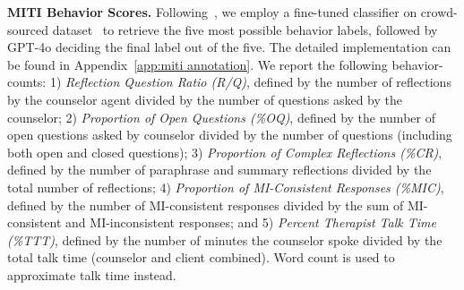 \noindent
\textbf{MITI Behavior Scores.} Following~\citet{xie2024few}, we employ a fine-tuned classifier on crowd-sourced dataset~\citep{welivita2022curating} to retrieve the five most possible behavior labels, followed by GPT-4o deciding the final label out of the five. The detailed implementation can be found in Appendix~\ref{app:miti annotation}.  We report the following behavior-counts: 1) \emph{Reflection Question Ratio (R/Q)}, defined by the number of reflections by the counselor agent divided by the number of questions asked by the counselor; 2) \emph{Proportion of Open Questions (\%OQ)}, defined by the number of open questions asked by counselor divided by the number of questions (including both open and closed questions); 3) \emph{Proportion of Complex Reflections (\%CR)}, defined by the number of paraphrase and summary reflections divided by the total number of reflections; 4) \emph{Proportion of MI-Consistent Responses (\%MIC)}, defined by the number of MI-consistent responses divided by the sum of MI-consistent and MI-inconsistent responses; and 5) \emph{Percent Therapist Talk Time (\%TTT)}, defined by the number of minutes the counselor spoke divided by the total talk time (counselor and client combined). Word count is used to approximate talk time instead.

